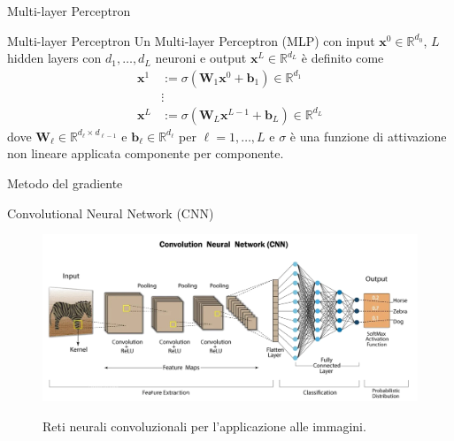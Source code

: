 \documentclass[aspectratio=169]{beamer}
\newcommand{\numberset}{\mathbb}
\newcommand{\R}{\numberset{R}}
\begin{document}
\begin{frame}{Multi-layer Perceptron}
 \begin{definition}{Multi-layer Perceptron}
  Un Multi-layer Perceptron (MLP) con input $\mathbf{x}^{0}\in \R^{d_{0}}$, $L$ hidden layers con $d_{1}, \ldots, d_{L}$ neuroni e output $\mathbf{x}^{L}\in \R^{d_{L}}$ è definito come
    \begin{align*}
     \mathbf{x}^{1} &:= \sigma\left( \mathbf{W}_{1} \mathbf{x}^{0} + \mathbf{b}_{1} \right) \in \R^{d_{1}} \\
     &\vdots \\
     \mathbf{x}^{L} &:= \sigma\left( \mathbf{W}_{L} \mathbf{x}^{L-1} + \mathbf{b}_{L} \right) \in \R^{d_{L}}
    \end{align*}
    dove $\mathbf{W}_{\ell}\in \R^{d_{\ell}\times d_{\ell-1}}$ e $\mathbf{b}_{\ell}\in \R^{d_{\ell}}$ per $\ell=1,\ldots, L$ e $\sigma$ è una funzione di attivazione non lineare applicata componente per componente.
 \end{definition}
\end{frame}

\begin{frame}{Metodo del gradiente}

\end{frame}

\begin{frame}{Convolutional Neural Network (CNN)}
\begin{figure}
    \begin{minipage}{0.7\textwidth}
        \centering
        \includegraphics[width=\textwidth]{architectures/CNN.png}
    \end{minipage}%
    \begin{minipage}{0.3\textwidth}
        \centering
        Reti neurali convoluzionali per l'applicazione alle immagini.
    \end{minipage}
\end{figure}
\end{frame}
\end{document}
